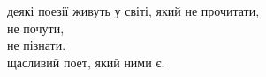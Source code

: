 деякі поезії живуть у світі, який не прочитати,\\
не почути,\\
не пізнати.\\

щасливий поет, який ними є.\\
